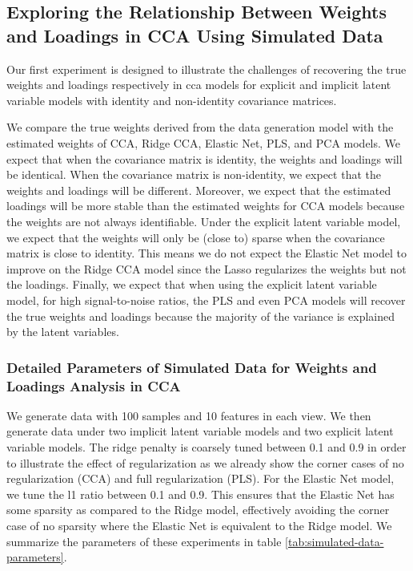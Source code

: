 \subsection{Exploring the Relationship Between Weights and Loadings in CCA Using Simulated Data}

Our first experiment is designed to illustrate the challenges of recovering the true weights and \gls{loadings} respectively in \acrshort{cca} models for explicit and implicit latent variable models with identity and non-identity covariance matrices.

We compare the true weights derived from the data generation model with the estimated weights of CCA, Ridge CCA, Elastic Net, PLS, and PCA models.
We expect that when the covariance matrix is identity, the weights and \gls{loadings} will be identical.
When the covariance matrix is non-identity, we expect that the weights and \gls{loadings} will be different.
Moreover, we expect that the estimated loadings will be more stable than the estimated weights for CCA models because the weights are not always identifiable.
Under the explicit latent variable model, we expect that the weights will only be (close to) sparse when the covariance matrix is close to identity.
This means we do not expect the Elastic Net model to improve on the Ridge CCA model since the Lasso regularizes the weights but not the \gls{loadings}.
Finally, we expect that when using the explicit latent variable model, for high signal-to-noise ratios, the PLS and even PCA models will recover the true weights and \gls{loadings} because the majority of the variance is explained by the latent variables.

\subsubsection{Detailed Parameters of Simulated Data for Weights and Loadings Analysis in CCA} We generate data with 100 samples and 10 features in each view.
We then generate data under two implicit latent variable models and two explicit latent variable models.
The ridge penalty is coarsely tuned between 0.1 and 0.9 in order to illustrate the effect of regularization as we already show the corner cases of no regularization (CCA) and full regularization (PLS).
For the Elastic Net model, we tune the l1 ratio between 0.1 and 0.9. This ensures that the Elastic Net has some sparsity as compared to the Ridge model, effectively avoiding the corner case of no sparsity where the Elastic Net is equivalent to the Ridge model.
We summarize the parameters of these experiments in table \ref{tab:simulated-data-parameters}.

